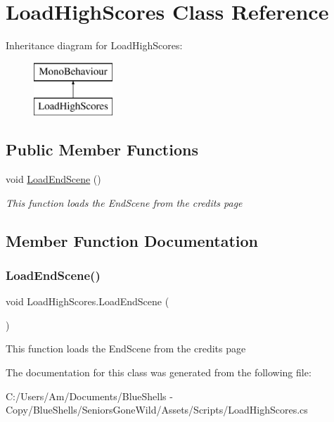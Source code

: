 \hypertarget{class_load_high_scores}{}\section{Load\+High\+Scores Class Reference}
\label{class_load_high_scores}
Inheritance diagram for Load\+High\+Scores\+:\begin{figure}[H]
\begin{center}
\leavevmode
\includegraphics[height=2.000000cm]{class_load_high_scores}
\end{center}
\end{figure}
\subsection*{Public Member Functions}
\begin{DoxyCompactItemize}
\item 
void \mbox{\hyperlink{class_load_high_scores_a70d2922d1154abdd92e247e3ea9f11e5}{Load\+End\+Scene}} ()
\begin{DoxyCompactList}\small\item\em This function loads the End\+Scene from the credits page \end{DoxyCompactList}\end{DoxyCompactItemize}


\subsection{Member Function Documentation}
\mbox{\label{class_load_high_scores_a70d2922d1154abdd92e247e3ea9f11e5}} 
\subsubsection{\texorpdfstring{Load\+End\+Scene()}{LoadEndScene()}}
{\footnotesize\ttfamily void Load\+High\+Scores.\+Load\+End\+Scene (\begin{DoxyParamCaption}{ }\end{DoxyParamCaption})}



This function loads the End\+Scene from the credits page 



The documentation for this class was generated from the following file\+:\begin{DoxyCompactItemize}
\item 
C\+:/\+Users/\+Am/\+Documents/\+Blue\+Shells -\/ Copy/\+Blue\+Shells/\+Seniors\+Gone\+Wild/\+Assets/\+Scripts/Load\+High\+Scores.\+cs\end{DoxyCompactItemize}
